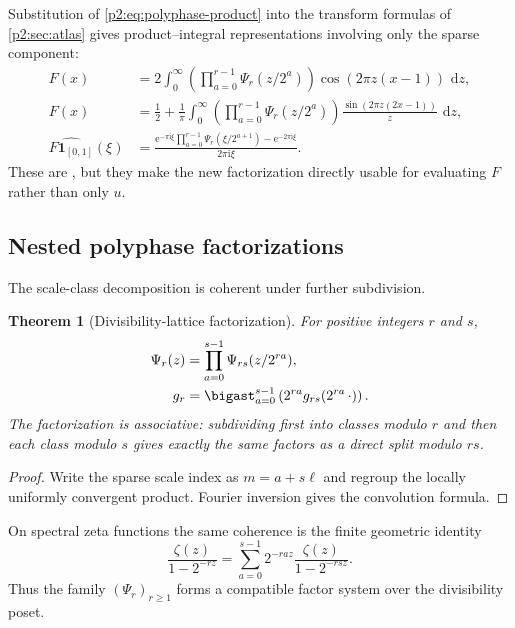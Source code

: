 \documentclass[11pt,oneside]{article}
\newtheorem{theorem}{Theorem}[section]
\theoremstyle{definition}
\newcommand{\dd}{\,\mathrm d}
\newcommand{\e}{\mathrm e}
\newcommand{\ii}{\mathrm i}
\begin{document}
Substitution of \eqref{p2:eq:polyphase-product} into the transform formulas of
\cref{p2:sec:atlas} gives product--integral representations involving only the
sparse component:
\begin{align}
 F(x)
 &=2\int_0^\infty
   \left(\prod_{a=0}^{r-1}\Psi_r(z/2^a)\right)
   \cos(2\pi z(x-1))\,\dd z,                              \label{p2:eq:F-polyphase-cosine-integral}\\
 F(x)
 &=\frac12+\frac1\pi\int_0^\infty
   \left(\prod_{a=0}^{r-1}\Psi_r(z/2^a)\right)
   \frac{\sin(2\pi z(2x-1))}{z}\,\dd z,                 \label{p2:eq:F-polyphase-CDF-integral}\\
 \widehat{F\mathbf1_{[0,1]}}(\xi)
 &=\frac{\e^{-\pi\ii\xi}
   \prod_{a=0}^{r-1}\Psi_r(\xi/2^{a+1})-
   \e^{-2\pi\ii\xi}}{2\pi\ii\xi}.                   \label{p2:eq:F-polyphase-Fourier}
\end{align}
These are \statusderived, but they make the new factorization directly usable
for evaluating $F$ rather than only $u$.

\subsection{Nested polyphase factorizations}

The scale-class decomposition is coherent under further subdivision.

\begin{theorem}[Divisibility-lattice factorization]
\label{p2:thm:nested-polyphase}
For positive integers $r$ and $s$,
\begin{align}
 \Psi_r(z)
 &=\prod_{a=0}^{s-1}\Psi_{rs}(z/2^{ra}),                  \label{p2:eq:nested-Psi}\\
 g_r
 &=\bigast_{a=0}^{s-1}\left(2^{ra}g_{rs}(2^{ra}\,\cdot)\right). \label{p2:eq:nested-gr}
\end{align}
The factorization is associative: subdividing first into classes modulo $r$
and then each class modulo $s$ gives exactly the same factors as a direct split
modulo $rs$.
\end{theorem}

\begin{proof}
Write the sparse scale index as $m=a+s\ell$ and regroup the locally uniformly
convergent product.  Fourier inversion gives the convolution formula.
\end{proof}

On spectral zeta functions the same coherence is the finite geometric identity
\begin{equation}
 \frac{\zeta(z)}{1-2^{-rz}}
 =\sum_{a=0}^{s-1}2^{-raz}\frac{\zeta(z)}{1-2^{-rsz}}.     \label{p2:eq:nested-zeta}
\end{equation}
Thus the family $(\Psi_r)_{r\ge1}$ forms a compatible factor system over the
divisibility poset.
\end{document}
